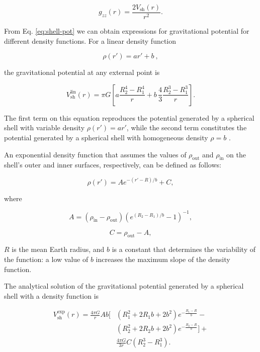 \documentclass[extra, referee]{gji}
\begin{document}
\begin{equation}
    g_{zz}(r) = \frac{2V_\text{sh}(r)}{r^2}.
\end{equation}

From Eq. \ref{eq:shell-pot} we can obtain expressions for gravitational potential for
different density functions.
For a linear density function

\begin{equation}
    \rho(r') = ar' + b\ ,
\end{equation}

\noindent
the gravitational potential at any external point is

\begin{equation}
    V_\text{sh}^\text{lin}(r) = \pi G \left[
    a \frac{R_2^4 - R_1^4}{r} +
    b \,\frac{4}{3} \frac{R_2^3 - R_1^3}{r} \right].
    \label{eq:shell-pot-linear}
\end{equation}

\noindent The first term on this equation reproduces the potential generated
by a spherical shell with variable density $\rho(r') = ar'$, while the second
term constitutes the potential generated by a spherical shell with homogeneous
density $\rho = b$ \citep{Mikuska2006,Grombein2013}.

An exponential density function that assumes the values of $\rho_\text{out}$ and
$\rho_\text{in}$ on the shell's outer and inner surfaces, respectively, can be defined
as follows:

\begin{equation}
    \rho(r') = A e^{-(r' - R)/b} + C,
\end{equation}

\noindent where

\begin{equation}
    A = (\rho_\text{in} - \rho_\text{out})
        \left( e^{( R_2 - R_1 )/b} - 1 \right)^{-1},
\end{equation}

\begin{equation}
    C = \rho_\text{out} - A,
\end{equation}

\noindent $R$ is the mean Earth radius, and $b$ is a constant
that determines the variability of the function: a low value of $b$
increases the maximum slope of the density function.

The analytical solution of the gravitational potential generated by a
spherical shell with a density function is

\begin{equation}
    \begin{split}
        V_\text{sh}^\text{exp}(r) = \frac{4\pi G}{r}
        Ab
        \Big[
        & (R_1^2 + 2R_1 b + 2b^2)e^{-\frac{R_1 - R}{b}} - \\
        & (R_2^2 + 2R_2 b + 2b^2)e^{-\frac{R_2 - R}{b}}
        \Big] + \\
        & \frac{4 \pi G}{3 r} C (R_2^3 - R_1^3).
    \end{split}
\label{eq:shell-pot-exp}
\end{equation}
\end{document}
